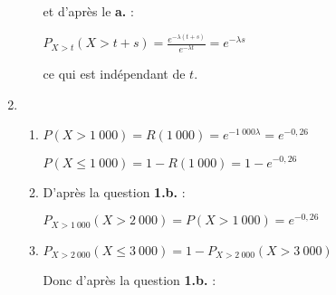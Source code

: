 \begin{corrige}
\begin{enumerate}
\begin{enumerate}[label=\alph*.]
               \par
               \par
               et d'après le \textbf{a.} :
               \par
               \par
               \par
               $P_{X > t}\left(X > t+s\right)=\frac{e^{-\lambda  \left(t+s\right)}}{e^{-\lambda  t}}=e^{-\lambda  s}$
               \par
               \par
               \par
               ce qui est indépendant de $t$.
               \par
          \end{enumerate}
          \par
          \item
          \par
          \begin{enumerate}[label=\alph*.]
               \par
               \item
               \par
               $P\left(X > 1~000\right)=R\left(1~000\right)=e^{-1~000\lambda }=e^{-0,26}$
               \par
               \par
               \par
               $P\left(X\leqslant 1~000\right)=1-R\left(1~000\right)=1-e^{-0,26}$
               \par
               \item  D'après la question \textbf{1.b.} :
               \par
               \par
               \par
               $P_{X > 1~000}\left(X > 2~000\right)=P\left(X > 1~000\right)=e^{-0,26}$
               \par
               \item $P_{X > 2~000}\left(X\leqslant 3~000\right)=1-P_{X > 2~000}\left(X > 3~000\right) $
               \par
               \par
               \par
               Donc d'après la question \textbf{1.b.} :
               \par
               \par
               \par

\end{enumerate}
\end{enumerate}
\end{corrige}

